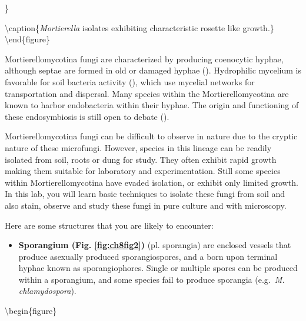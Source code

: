 \documentclass[]{book}
\providecommand{\tightlist}{%
  \setlength{\itemsep}{0pt}\setlength{\parskip}{0pt}}
\begin{document}
\}

\textbackslash caption\{\emph{Mortierella} isolates exhibiting characteristic rosette like growth.\}\label{fig:ch8fig1}
\textbackslash end\{figure\}

Mortierellomycotina fungi are characterized by producing coenocytic hyphae, although septae are formed in old or damaged hyphae (\citet{Spatafora_2016}). Hydrophilic mycelium is favorable for soil bacteria activity (\citet{Kohlmeier_2005}), which use mycelial networks for transportation and dispersal. Many species within the Mortierellomycotina are known to harbor endobacteria within their hyphae. The origin and functioning of these endosymbiosis is still open to debate (\citet{Uehling_2017}).

Mortierellomycotina fungi can be difficult to observe in nature due to the cryptic nature of these microfungi. However, species in this lineage can be readily isolated from soil, roots or dung for study. They often exhibit rapid growth making them suitable for laboratory and experimentation. Still some species within Mortierellomycotina have evaded isolation, or exhibit only limited growth. In this lab, you will learn basic techniques to isolate these fungi from soil and also stain, observe and study these fungi in pure culture and with microscopy.

Here are some structures that you are likely to encounter:

\begin{itemize}
\tightlist
\item
  \textbf{Sporangium (Fig. \ref{fig:ch8fig2}) }(pl. sporangia) are enclosed vessels that produce asexually produced sporangiospores, and a born upon terminal hyphae known as sporangiophores. Single or multiple spores can be produced within a sporangium, and some species fail to produce sporangia (e.g.~\emph{M. chlamydospora}).
\end{itemize}

\textbackslash begin\{figure\}
\end{document}
